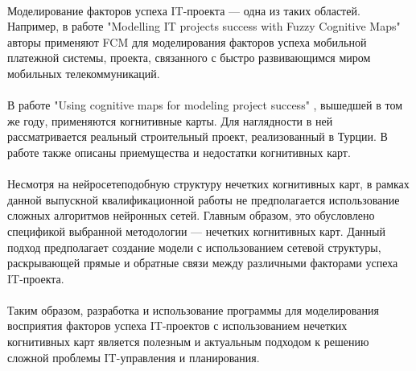 \documentclass{article}
\begin{document}
    ~\\
    Моделирование факторов успеха IT-проекта — одна из таких областей. Например, в работе "{}Modelling IT projects success with Fuzzy Cognitive Maps"{} \cite{litlink18} авторы применяют FCM для моделирования факторов успеха мобильной платежной системы, проекта, связанного с быстро развивающимся миром мобильных телекоммуникаций.\\
    ~\\
    В работе "{}Using cognitive maps for modeling project success"{} \cite{litlink19}, вышедшей в том же году, применяются когнитивные карты. Для наглядности в ней рассматривается реальный строительный проект, реализованный в Турции. В работе также описаны приемущества и недостатки когнитивных карт.\\
    ~\\
    Несмотря на нейросетеподобную структуру нечетких когнитивных карт, в рамках данной выпускной квалификационной работы не предполагается использование сложных алгоритмов нейронных сетей. Главным образом, это обусловлено спецификой выбранной методологии — нечетких когнитивных карт. Данный подход предполагает создание модели с использованием сетевой структуры, раскрывающей прямые и обратные связи между различными факторами успеха IT-проекта.\\
    ~\\
    Таким образом, разработка и использование программы для моделирования восприятия факторов успеха IT-проектов с использованием нечетких когнитивных карт является полезным и актуальным подходом к решению сложной проблемы IT-управления и планирования.\\
\end{document}
